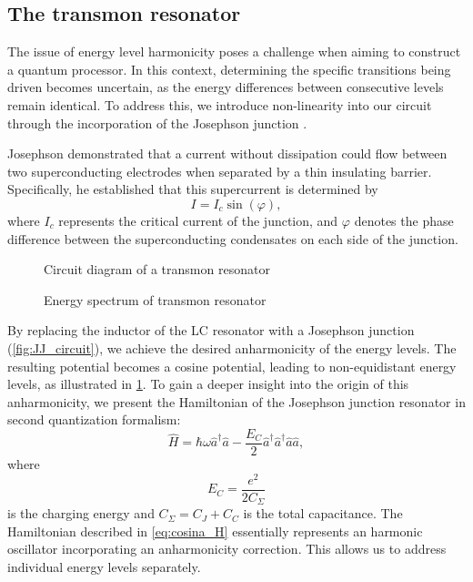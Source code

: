 \subsection{The transmon resonator}

The issue of energy level harmonicity poses a challenge when aiming to construct a quantum processor. 
In this context, determining the specific transitions being driven becomes uncertain, as the energy differences between consecutive levels remain identical.
To address this, we introduce non-linearity into our circuit through the incorporation of the Josephson junction \cite{JOSEPHSON}.

Josephson demonstrated that a current without dissipation could flow between two superconducting electrodes when separated by a thin insulating barrier. Specifically, he established that this supercurrent is determined by
\begin{equation}
    I = I_c \sin(\varphi),
\end{equation}
where $I_c$ represents the critical current of the junction, and $\varphi$ denotes the phase difference between the superconducting condensates on each side of the junction.
\begin{figure}
    \begin{minipage}[b]{0.5\linewidth}
      \centering
        
        \vspace{-0.8cm}
        \caption{Circuit diagram of a transmon resonator}
        \label{fig:JJ_circuit}
    \end{minipage}
    \hfill
    \begin{minipage}[b]{0.45\linewidth}
      \centering
      
      \vspace{-1.2cm}
      \caption{Energy spectrum of transmon resonator}
      \label{fig:Energy_spectrum_JJ}
    \end{minipage}
  \end{figure}

By replacing the inductor of the LC resonator with a Josephson junction (\cref{fig:JJ_circuit}), we achieve the desired anharmonicity of the energy levels.
The resulting potential becomes a cosine potential, leading to non-equidistant energy levels, as illustrated in \cref{fig:Energy_spectrum_JJ}.
To gain a deeper insight into the origin of this anharmonicity, we present the Hamiltonian of the Josephson junction resonator in second quantization formalism:
\begin{equation}
\label{eq:cosina_H}
    \hat{H} = 
    \hbar \omega \hat{a}^\dagger \hat{a} - 
    \frac{E_C}{2}\hat{a}^\dagger\hat{a}^\dagger\hat{a}\hat{a} ,
\end{equation}
where
\begin{equation}
    E_C = \frac{e^2}{2 C_\Sigma}
\end{equation} 
is the charging energy and $C_\Sigma = C_J + C_C$ is the total capacitance.
The Hamiltonian described in \cref{eq:cosina_H} essentially represents an harmonic oscillator incorporating an anharmonicity correction. 
This allows us to address individual energy levels separately.


